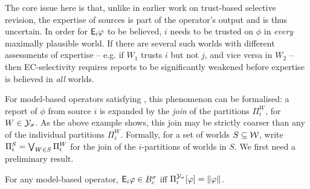The core issue here is that, unlike in earlier work on trust-based selective
revision, the expertise of sources is part of the operator's output and is thus
uncertain. In order for $\mathsf{E}_i\varphi$ to be believed, $i$ needs to be trusted on
$\phi$ in \emph{every} maximally plausible world. If there are several such
worlds with different assessments of expertise -- e.g. if $W_1$ trusts $i$ but
not $j$, and vice versa in $W_2$ -- then EC-selectivity requires reports to be
significantly weakened before expertise is believed in \emph{all} worlds.

For model-based operators satisfying \soundness{}, this phenomenon can be
formalised: a report of $\phi$ from source $i$ is expanded by the
\emph{join}\footnotemark{} of the partitions $\Pi^W_i$, for $W \in \mathcal{Y}_\sigma$.
As the above example shows, this join may be strictly coarser than any of the
individual partitions $\Pi^W_i$. Formally, for a set of worlds $S \subseteq
\mathcal{W}$, write $\Pi^S_i = \bigvee_{W \in S}{\Pi^W_i}$ for the join of the
$i$-partitions of worlds in $S$. We first need a preliminary result.


\begin{lemma}
    \label{kr_lemma_expertise_join}
    For any model-based operator, $\mathsf{E}_i\varphi \in B^\sigma_c$ iff
    $\Pi^{\mathcal{Y}_\sigma}_i[\varphi] = \|{\varphi}\|$.
\end{lemma}


